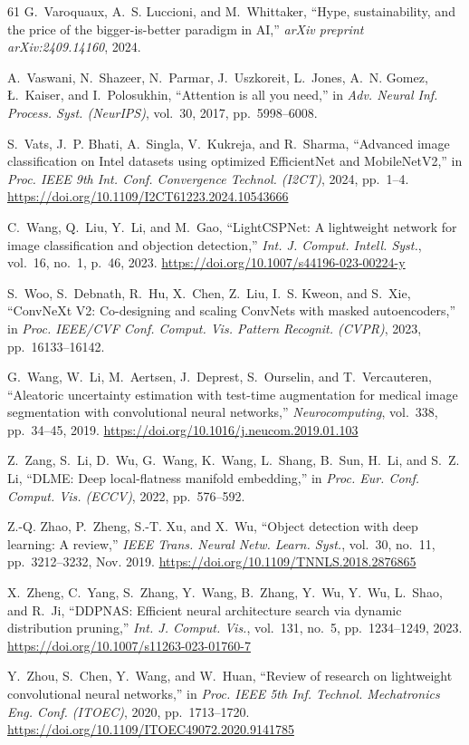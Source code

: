 ﻿\documentclass[journal]{IEEEtran}
\providecommand{\doi}[1]{\url{https://doi.org/#1}}
\begin{document}
\begin{thebibliography}{61}
G.~Varoquaux, A.~S. Luccioni, and M.~Whittaker, ``Hype, sustainability, and the price of the bigger-is-better paradigm in AI,'' \emph{arXiv preprint arXiv:2409.14160}, 2024.

A.~Vaswani, N.~Shazeer, N.~Parmar, J.~Uszkoreit, L.~Jones, A.~N. Gomez, {\L}.~Kaiser, and I.~Polosukhin, ``Attention is all you need,'' in \emph{Adv. Neural Inf. Process. Syst. (NeurIPS)}, vol.~30, 2017, pp.~5998--6008.

S.~Vats, J.~P. Bhati, A.~Singla, V.~Kukreja, and R.~Sharma, ``Advanced image classification on Intel datasets using optimized EfficientNet and MobileNetV2,'' in \emph{Proc. IEEE 9th Int. Conf. Convergence Technol. (I2CT)}, 2024, pp.~1--4. \doi{10.1109/I2CT61223.2024.10543666}

C.~Wang, Q.~Liu, Y.~Li, and M.~Gao, ``LightCSPNet: A lightweight network for image classification and objection detection,'' \emph{Int. J. Comput. Intell. Syst.}, vol.~16, no.~1, p.~46, 2023. \doi{10.1007/s44196-023-00224-y}

S.~Woo, S.~Debnath, R.~Hu, X.~Chen, Z.~Liu, I.~S. Kweon, and S.~Xie, ``ConvNeXt V2: Co-designing and scaling ConvNets with masked autoencoders,'' in \emph{Proc. IEEE/CVF Conf. Comput. Vis. Pattern Recognit. (CVPR)}, 2023, pp.~16133--16142.

G.~Wang, W.~Li, M.~Aertsen, J.~Deprest, S.~Ourselin, and T.~Vercauteren, ``Aleatoric uncertainty estimation with test-time augmentation for medical image segmentation with convolutional neural networks,'' \emph{Neurocomputing}, vol.~338, pp.~34--45, 2019. \doi{10.1016/j.neucom.2019.01.103}

Z.~Zang, S.~Li, D.~Wu, G.~Wang, K.~Wang, L.~Shang, B.~Sun, H.~Li, and S.~Z. Li, ``DLME: Deep local-flatness manifold embedding,'' in \emph{Proc. Eur. Conf. Comput. Vis. (ECCV)}, 2022, pp.~576--592.

Z.-Q. Zhao, P.~Zheng, S.-T. Xu, and X.~Wu, ``Object detection with deep learning: A review,'' \emph{IEEE Trans. Neural Netw. Learn. Syst.}, vol.~30, no.~11, pp.~3212--3232, Nov. 2019. \doi{10.1109/TNNLS.2018.2876865}

X.~Zheng, C.~Yang, S.~Zhang, Y.~Wang, B.~Zhang, Y.~Wu, Y.~Wu, L.~Shao, and R.~Ji, ``DDPNAS: Efficient neural architecture search via dynamic distribution pruning,'' \emph{Int. J. Comput. Vis.}, vol.~131, no.~5, pp.~1234--1249, 2023. \doi{10.1007/s11263-023-01760-7}

Y.~Zhou, S.~Chen, Y.~Wang, and W.~Huan, ``Review of research on lightweight convolutional neural networks,'' in \emph{Proc. IEEE 5th Inf. Technol. Mechatronics Eng. Conf. (ITOEC)}, 2020, pp.~1713--1720. \doi{10.1109/ITOEC49072.2020.9141785}


\end{thebibliography}
\end{document}

